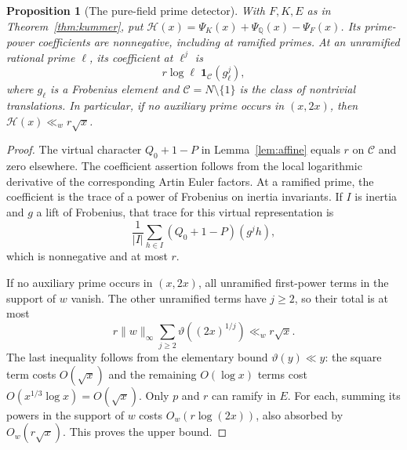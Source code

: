 \documentclass[11pt]{article}
\newcommand{\Q}{\mathbb Q}
\newtheorem{proposition}[theorem]{Proposition}
\theoremstyle{definition}
\theoremstyle{remark}
\begin{document}
\begin{proposition}[The pure-field prime detector]\label{prop:detector}
With $F,K,E$ as in Theorem~\ref{thm:kummer}, put
$\mathcal H(x)=\Psi_K(x)+\Psi_{\Q}(x)-\Psi_F(x)$.
Its prime-power coefficients are nonnegative, including at
ramified primes.  At an unramified rational prime $\ell$, its
coefficient at $\ell^j$ is
\[
 r\log\ell\;\mathbf 1_{\mathcal C}(g_\ell^j),
\]
where $g_\ell$ is a Frobenius element and
$\mathcal C=N\setminus\{1\}$ is the class of nontrivial
translations.  In particular, if no auxiliary prime occurs in
$(x,2x)$, then $\mathcal H(x)\ll_w r\sqrt x$.
\end{proposition}
\begin{proof}
The virtual character $Q_0+1-P$ in Lemma~\ref{lem:affine}
equals $r$ on $\mathcal C$ and zero elsewhere.
The coefficient assertion follows from the local logarithmic
derivative of the corresponding Artin Euler factors.
At a ramified prime, the coefficient is the trace of a power
of Frobenius on inertia invariants.  If $I$ is inertia and
$g$ a lift of Frobenius, that trace for this virtual
representation is
\[
 \frac1{|I|}\sum_{h\in I}(Q_0+1-P)(g^jh),
\]
which is nonnegative and at most $r$.

If no auxiliary prime occurs in $(x,2x)$, all unramified
first-power terms in the support of $w$ vanish.
The other unramified terms have $j\geq2$, so their total is
at most
\[
 r\|w\|_\infty\sum_{j\geq2}\vartheta((2x)^{1/j})
       \ll_w r\sqrt x.
\]
The last inequality follows from the elementary bound
$\vartheta(y)\ll y$: the square term costs $O(\sqrt x)$
and the remaining $O(\log x)$ terms cost
$O(x^{1/3}\log x)=O(\sqrt x)$.
Only $p$ and $r$ can ramify in $E$.
For each, summing its powers in the support of $w$ costs
$O_w(r\log(2x))$, also absorbed by $O_w(r\sqrt x)$.
This proves the upper bound.
\end{proof}
\end{document}
